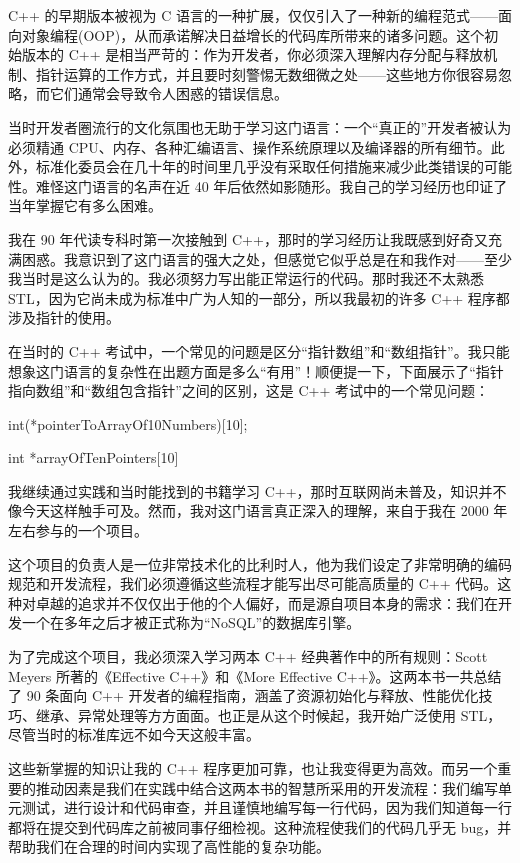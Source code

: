 C++ 的早期版本被视为 C 语言的一种扩展，仅仅引入了一种新的编程范式——面向对象编程(OOP)，从而承诺解决日益增长的代码库所带来的诸多问题。这个初始版本的 C++ 是相当严苛的：作为开发者，你必须深入理解内存分配与释放机制、指针运算的工作方式，并且要时刻警惕无数细微之处——这些地方你很容易忽略，而它们通常会导致令人困惑的错误信息。

当时开发者圈流行的文化氛围也无助于学习这门语言：一个“真正的”开发者被认为必须精通 CPU、内存、各种汇编语言、操作系统原理以及编译器的所有细节。此外，标准化委员会在几十年的时间里几乎没有采取任何措施来减少此类错误的可能性。难怪这门语言的名声在近 40 年后依然如影随形。我自己的学习经历也印证了当年掌握它有多么困难。

我在 90 年代读专科时第一次接触到 C++，那时的学习经历让我既感到好奇又充满困惑。我意识到了这门语言的强大之处，但感觉它似乎总是在和我作对——至少我当时是这么认为的。我必须努力写出能正常运行的代码。那时我还不太熟悉 STL，因为它尚未成为标准中广为人知的一部分，所以我最初的许多 C++ 程序都涉及指针的使用。

在当时的 C++ 考试中，一个常见的问题是区分“指针数组”和“数组指针”。我只能想象这门语言的复杂性在出题方面是多么“有用”！顺便提一下，下面展示了“指针指向数组”和“数组包含指针”之间的区别，这是 C++ 考试中的一个常见问题：

\begin{cpp}
int(*pointerToArrayOf10Numbers)[10];

int *arrayOfTenPointers[10]
\end{cpp}

我继续通过实践和当时能找到的书籍学习 C++，那时互联网尚未普及，知识并不像今天这样触手可及。然而，我对这门语言真正深入的理解，来自于我在 2000 年左右参与的一个项目。

这个项目的负责人是一位非常技术化的比利时人，他为我们设定了非常明确的编码规范和开发流程，我们必须遵循这些流程才能写出尽可能高质量的 C++ 代码。这种对卓越的追求并不仅仅出于他的个人偏好，而是源自项目本身的需求：我们在开发一个在多年之后才被正式称为“NoSQL”的数据库引擎。

为了完成这个项目，我必须深入学习两本 C++ 经典著作中的所有规则：Scott Meyers 所著的《Effective C++》和《More Effective C++》。这两本书一共总结了 90 条面向 C++ 开发者的编程指南，涵盖了资源初始化与释放、性能优化技巧、继承、异常处理等方方面面。也正是从这个时候起，我开始广泛使用 STL，尽管当时的标准库远不如今天这般丰富。

这些新掌握的知识让我的 C++ 程序更加可靠，也让我变得更为高效。而另一个重要的推动因素是我们在实践中结合这两本书的智慧所采用的开发流程：我们编写单元测试，进行设计和代码审查，并且谨慎地编写每一行代码，因为我们知道每一行都将在提交到代码库之前被同事仔细检视。这种流程使我们的代码几乎无 bug，并帮助我们在合理的时间内实现了高性能的复杂功能。

